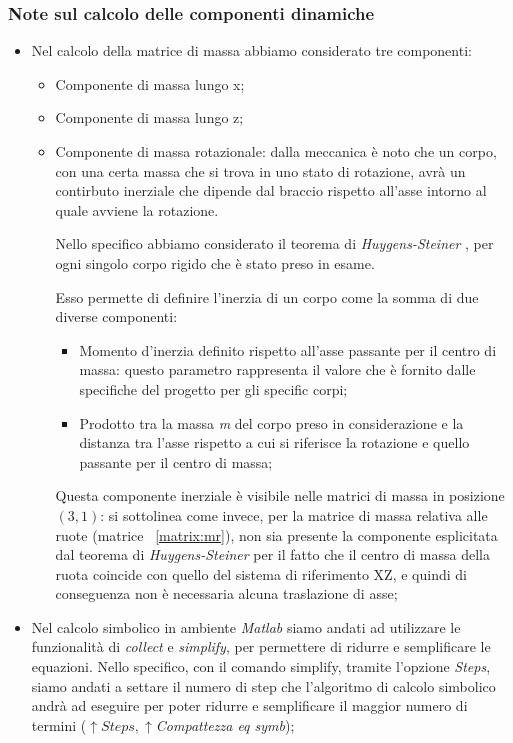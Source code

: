 \subsubsection{Note sul calcolo delle componenti dinamiche}
\begin{itemize}
	\item Nel calcolo della matrice di massa abbiamo considerato tre componenti:
	\begin{itemize}
		\item Componente di massa lungo x;
		\item Componente di massa lungo z;
		\item Componente di massa rotazionale: dalla meccanica è noto che un corpo, con una certa massa che si trova in uno stato di rotazione, avrà un contirbuto inerziale che dipende dal braccio rispetto all'asse intorno al quale avviene la rotazione.
		
		Nello specifico abbiamo considerato il teorema di \textit{Huygens-Steiner} , per ogni singolo corpo rigido che è stato preso in esame.
		
		Esso permette di definire l'inerzia di un corpo come la somma di due diverse componenti:
		\begin{itemize}
			\item Momento d'inerzia definito rispetto all'asse passante per il centro di massa: questo parametro rappresenta il valore che è fornito dalle specifiche del progetto per gli specific corpi;
			\item Prodotto tra la massa \textit{m} del corpo preso in considerazione e la distanza tra l'asse rispetto a cui si riferisce la rotazione e quello passante per il centro di massa;
		\end{itemize}
	
		Questa componente inerziale è visibile nelle matrici di massa in posizione $(3, 1)$: si sottolinea come invece, per la matrice di massa relativa alle ruote (matrice ~\ref{matrix:mr}), non sia presente la componente esplicitata dal teorema di \textit{Huygens-Steiner} per il fatto che il centro di massa della ruota coincide con quello del sistema di riferimento XZ, e quindi di conseguenza non è necessaria alcuna traslazione di asse;
 	\end{itemize}
 	\item Nel calcolo simbolico in ambiente \textit{Matlab} siamo andati ad utilizzare le funzionalità di \textit{collect} e \textit{simplify}, per permettere di ridurre e semplificare le equazioni. Nello specifico, con il comando simplify, tramite l'opzione \textit{Steps}, siamo andati a settare il numero di step che l'algoritmo di calcolo simbolico andrà ad eseguire per poter ridurre e semplificare il maggior numero di termini ($\uparrow Steps, \uparrow $\textit{Compattezza eq symb});
 	

\end{itemize}
